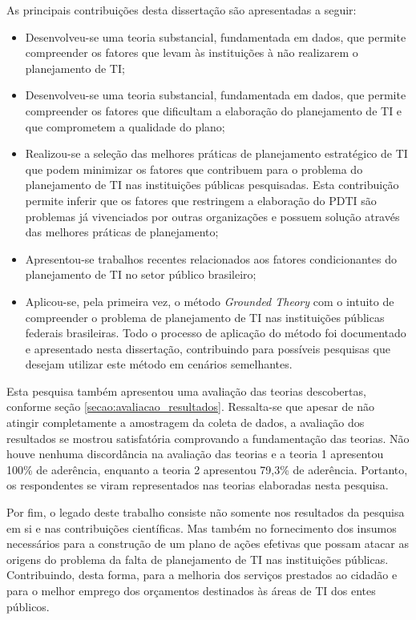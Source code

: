 As principais contribuições desta dissertação são apresentadas a seguir:
\begin{itemize}
\item Desenvolveu-se uma teoria substancial, fundamentada em dados, que permite compreender os fatores que levam às instituições à não realizarem o planejamento de TI;
\item Desenvolveu-se uma teoria substancial, fundamentada em dados, que permite compreender os fatores que dificultam a elaboração do planejamento de TI e que comprometem a qualidade do plano;
\item Realizou-se a seleção das melhores práticas de planejamento estratégico de TI que podem minimizar os fatores que contribuem para o problema do planejamento de TI nas instituições públicas pesquisadas. Esta contribuição permite inferir que os fatores que restringem a elaboração do PDTI são problemas já vivenciados por outras organizações e possuem solução através das melhores práticas de planejamento;
\item Apresentou-se trabalhos recentes relacionados aos fatores condicionantes do planejamento de TI no setor público brasileiro;
\item Aplicou-se, pela primeira vez, o método \textit{Grounded Theory} com o intuito de compreender o problema de planejamento de TI nas instituições públicas federais brasileiras. Todo o processo de aplicação do método foi documentado e apresentado nesta dissertação, contribuindo para possíveis pesquisas que desejam utilizar este método em cenários semelhantes.
\end{itemize}

Esta pesquisa também apresentou uma avaliação das teorias descobertas, conforme seção \ref{secao:avaliacao_resultados}. Ressalta-se que apesar de não atingir completamente a amostragem da coleta de dados, a avaliação dos resultados se mostrou satisfatória comprovando a fundamentação das teorias. Não houve nenhuma discordância na avaliação das teorias e a teoria 1 apresentou 100\% de aderência, enquanto a teoria 2 apresentou 79,3\% de aderência. Portanto, os respondentes se viram representados nas teorias elaboradas nesta pesquisa.

Por fim, o legado deste trabalho consiste não somente nos resultados da pesquisa em si e nas contribuições científicas. Mas também no fornecimento dos insumos necessários para a construção de um plano de ações efetivas que possam atacar as origens do problema da falta de planejamento de TI nas instituições públicas. Contribuindo, desta forma, para a melhoria dos serviços prestados ao cidadão e para o melhor emprego dos orçamentos destinados às áreas de TI dos entes públicos.

